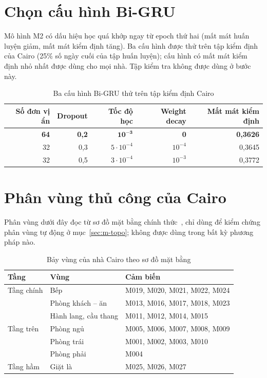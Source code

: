 
\chapter{Chọn cấu hình Bi-GRU}
\label{app:gru}

Mô hình M2 có dấu hiệu học quá khớp ngay từ epoch thứ hai (mất mát huấn luyện giảm, mất mát kiểm định
tăng). Ba cấu hình được thử trên tập kiểm định của Cairo (25\% số ngày cuối của tập huấn luyện); cấu hình
có mất mát kiểm định nhỏ nhất được dùng cho mọi nhà. Tập kiểm tra không được dùng ở bước này.

\begin{table}[htbp]
\centering
\caption{Ba cấu hình Bi-GRU thử trên tập kiểm định Cairo}
\label{tab:gru-config}
\begin{tabular}{rrrrr}
\toprule
Số đơn vị ẩn & Dropout & Tốc độ học & Weight decay & Mất mát kiểm định \\
\midrule
\textbf{64} & \textbf{0,2} & $\mathbf{10^{-3}}$ & \textbf{0} & \textbf{0,3626} \\
32 & 0,3 & $5\cdot10^{-4}$ & $10^{-4}$ & 0,3645 \\
32 & 0,5 & $3\cdot10^{-4}$ & $10^{-3}$ & 0,3772 \\
\bottomrule
\end{tabular}
\end{table}

\chapter{Phân vùng thủ công của Cairo}
\label{app:cairo-zones}

Phân vùng dưới đây đọc từ sơ đồ mặt bằng chính thức~\cite{casas2025floorplans}, chỉ dùng để kiểm chứng
phân vùng tự động ở mục~\ref{sec:m-topo}; không được dùng trong bất kỳ phương pháp nào.

\begin{table}[htbp]
\centering
\caption{Bảy vùng của nhà Cairo theo sơ đồ mặt bằng}
\label{tab:cairo-manual}
\begin{tabular}{lll}
\toprule
Tầng & Vùng & Cảm biến \\
\midrule
Tầng chính & Bếp & M019, M020, M021, M022, M024 \\
           & Phòng khách -- ăn & M013, M016, M017, M018, M023 \\
           & Hành lang, cầu thang & M011, M012, M014, M015 \\
Tầng trên  & Phòng ngủ & M005, M006, M007, M008, M009 \\
           & Phòng trái & M001, M002, M003, M010 \\
           & Phòng phải & M004 \\
Tầng hầm   & Giặt là & M025, M026, M027 \\
\bottomrule
\end{tabular}
\end{table}

